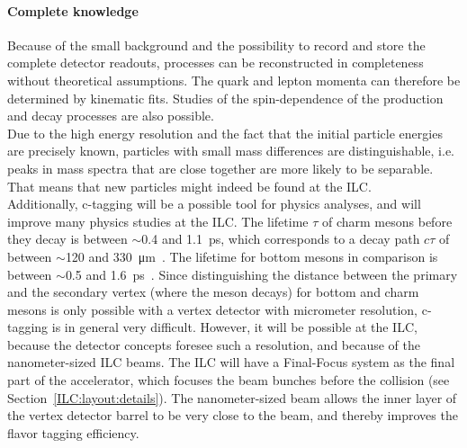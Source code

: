 \paragraph{Complete knowledge}
Because of the small background and the possibility to record and store the complete detector readouts, processes can be reconstructed in completeness without theoretical assumptions.
The quark and lepton momenta can therefore be determined by kinematic fits.
Studies of the spin-dependence of the production and decay processes are also possible.\\
Due to the high energy resolution and the fact that the initial particle energies are precisely known, particles with small mass differences are distinguishable, i.e. peaks in mass spectra that are close together are more likely to be separable.
That means that new particles might indeed be found at the ILC.
\\Additionally, c-tagging will be a possible tool for physics analyses, and will improve many physics studies at the ILC.
The lifetime $\tau$ of charm mesons before they decay is between $\sim$0.4 and \SI{1.1}{\pico\second}, which corresponds to a decay path $c\tau$ of between $\sim$120 and \SI{330}{\micro\meter}~\cite[p. 1044ff]{PDG}.
The lifetime for bottom mesons in comparison is between $\sim$0.5 and \SI{1.6}{\pico\second}~\cite[p. 1137ff]{PDG}.
Since distinguishing the distance between the primary and the secondary vertex (where the meson decays) for bottom and charm mesons is only possible with a vertex detector with micrometer resolution, c-tagging is in general very difficult. 
However, it will be possible at the ILC, because the detector concepts foresee such a resolution, and because of the nanometer-sized ILC beams.
The ILC will have a Final-Focus system as the final part of the accelerator, which focuses the beam bunches before the collision (see Section~\ref{ILC:layout:details}).
The nanometer-sized beam allows the inner layer of the vertex detector barrel to be very close to the beam, and thereby improves the flavor tagging efficiency. 


